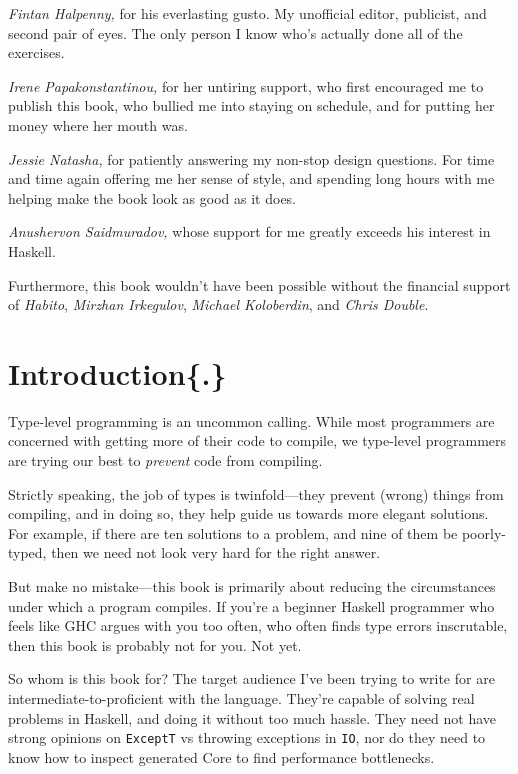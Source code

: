 \documentclass[
  11pt,
]{book}
\theoremstyle{nonumberplain}
\begin{document}
\emph{Fintan Halpenny,} for his everlasting gusto. My unofficial editor,
publicist, and second pair of eyes. The only person I know who's
actually done all of the exercises.

\emph{Irene Papakonstantinou,} for her untiring support, who first
encouraged me to publish this book, who bullied me into staying on
schedule, and for putting her money where her mouth was.

\emph{Jessie Natasha,} for patiently answering my non-stop design
questions. For time and time again offering me her sense of style, and
spending long hours with me helping make the book look as good as it
does.

\emph{Anushervon Saidmuradov,} whose support for me greatly exceeds his
interest in Haskell.

Furthermore, this book wouldn't have been possible without the financial
support of \emph{Habito}, \emph{Mirzhan Irkegulov}, \emph{Michael
Koloberdin}, and \emph{Chris Double}.

\hypertarget{introduction.}{%
\chapter{Introduction\{.\}}\label{introduction.}}

Type-level programming is an uncommon calling. While most programmers
are concerned with getting more of their code to compile, we type-level
programmers are trying our best to \emph{prevent} code from compiling.

Strictly speaking, the job of types is twinfold---they prevent (wrong)
things from compiling, and in doing so, they help guide us towards more
elegant solutions. For example, if there are ten solutions to a problem,
and nine of them be poorly-typed, then we need not look very hard for
the right answer.

But make no mistake---this book is primarily about reducing the
circumstances under which a program compiles. If you're a beginner
Haskell programmer who feels like GHC argues with you too often, who
often finds type errors inscrutable, then this book is probably not for
you. Not yet.

So whom is this book for? The target audience I've been trying to write
for are intermediate-to-proficient with the language. They're capable of
solving real problems in Haskell, and doing it without too much hassle.
They need not have strong opinions on \texttt{ExceptT} vs throwing
exceptions in \texttt{IO}, nor do they need to know how to inspect
generated Core to find performance bottlenecks.
\end{document}

